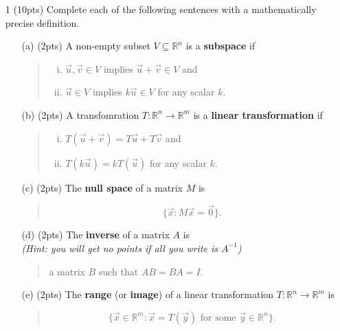 \documentclass{article}
\newcommand{\R}{\mathbb{R}}
\begin{document}
\begin{enumerate}
	\item[1 (10pts)] Complete each of the following sentences with a mathematically precise definition.
	\begin{enumerate}
		\item[(a) (2pts)] A non-empty subset $V\subseteq \R^n$ is a {\bf subspace} if
		\begin{quote}
			\begin{enumerate}[(i)]
				\item $\vec u,\vec v\in V$ implies $\vec u+\vec v\in V$ and
				\item $\vec u\in V$ implies $k\vec u\in V$ for any scalar $k$.
			\end{enumerate}
		\end{quote}
		\item[(b) (2pts)] A transfomration $T:\R^n\to\R^m$ is a {\bf linear transformation} if
		\begin{quote}
			\begin{enumerate}[(i)]
				\item $T(\vec u+\vec v)=T\vec u+T\vec v$ and
				\item $T(k\vec u)=kT(\vec u)$ for any scalar $k$.
			\end{enumerate}
		\end{quote}
		\item[(c) (2pts)] The {\bf null space} of a matrix $M$ is
		\begin{quote}
			\[
				\{\vec x:M\vec x=\vec 0\}.
			\]
		\end{quote}
		\item[(d) (2pts)] The {\bf inverse} of a matrix $A$ is \\ {\it(Hint: you will get no points if all you write is $A^{-1}$)}

		\begin{quote}
			a matrix $B$ such that $AB=BA=I$.
		\end{quote}
		\item[(e) (2pts)] The {\bf range} (or {\bf image}) of a linear transformation $T:\R^n\to\R^m$ is
		\begin{quote}
			\[
				\{\vec x\in \R^m:\vec x=T(\vec y)\text{ for some }\vec y\in \R^n\}.
			\]
		\end{quote}
		
	
		\vspace{5in}
	\end{enumerate}
	\clearpage


\end{enumerate}
\end{document}
